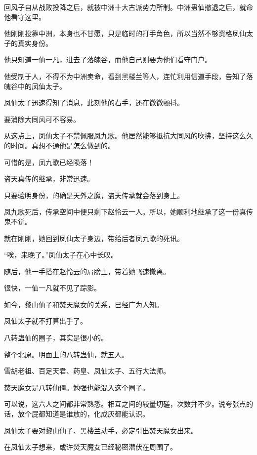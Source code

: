 
\begin{this_body}



回风子自从战败投降之后，就被中洲十大古派势力所制。中洲蛊仙撤退之后，就命他看守这里。

他刚刚投靠中洲，本身也不甘愿，只是临时的打手角色，所以当然不够资格凤仙太子的真实身份。

他只知道一仙一凡，进去了落魄谷，而他自己则要为他们看守门户。

他受制于人，不得不为中洲卖命，看到黑楼兰等人，连忙利用信道手段，告知了落魄谷中的凤仙太子。

凤仙太子迅速得知了消息，此刻他的右手，还在微微颤抖。

要消除大同风可不容易。

从这点上，凤仙太子不禁佩服凤九歌。他居然能够抵抗大同风的吹拂，坚持这么久的时间。真想不通他是怎么做到的。

可惜的是，凤九歌已经陨落！

盗天真传的继承，非常迅速。

只要验明身份，的确是天外之魔，盗天传承就会落到身上。

凤九歌死后，传承空间中便只剩下赵怜云一人。所以，她顺利地继承了这一份真传鬼不觉。

就在刚刚，她回到凤仙太子身边，带给后者凤九歌的死讯。

“唉，来晚了。”凤仙太子在心中长叹。

随后，他一手搭在赵怜云的肩膀上，带着她飞速撤离。

很快，一仙一凡就不见了踪影。

如今，黎山仙子和焚天魔女的关系，已经广为人知。

凤仙太子就不打算出手了。

八转蛊仙的圈子，其实是很小的。

整个北原。明面上的八转蛊仙，就五人。

雪胡老祖、百足天君、药皇、凤仙太子、五行大法师。

焚天魔女是八转仙僵。勉强也能混入这个圈子。

可以说，这六人之间都非常熟悉。相互之间的较量切磋，次数并不少。说夸张点的话，放个屁都知道是谁放的，化成灰都能认识。

凤仙太子要对黎山仙子、黑楼兰动手，必定引出焚天魔女出来。

在凤仙太子想来，或许焚天魔女已经秘密潜伏在周围了。


\end{this_body}
